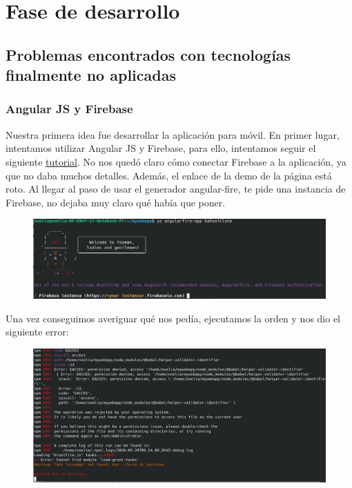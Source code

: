 \documentclass{article}
\begin{document}
	\section{Fase de desarrollo}
	\subsection{Problemas encontrados con tecnologías finalmente no aplicadas}
	\subsubsection{Angular JS y Firebase}
	Nuestra primera idea fue desarrollar la aplicación para móvil. En primer lugar, intentamos utilizar Angular JS y Firebase, para ello, intentamos seguir el siguiente 
	 \href{https://medium.com/@rotemtam/build-a-kahoot-clone-with-angularjs-and-firebase-b8b30891d968}{tutorial}. No nos quedó claro cómo conectar Firebase a la aplicación, ya que no daba muchos detalles. Además, el enlace de la demo de la página está roto. Al llegar al paso de usar el generador angular-fire, te pide una instancia de Firebase, no dejaba muy claro qué había que poner.
	 
	 \begin{figure}[H]
	 	\centering
	 	\includegraphics[totalheight=3.35cm]{img/1.png}
	 \end{figure}
 
 	Una vez conseguimos averiguar qué nos pedía, ejecutamos la orden y nos dio el siguiente error:
 	
 	\begin{figure}[H]
 		\centering
 		\includegraphics[totalheight=5.5cm]{img/2.png}
 	\end{figure}
\end{document}
